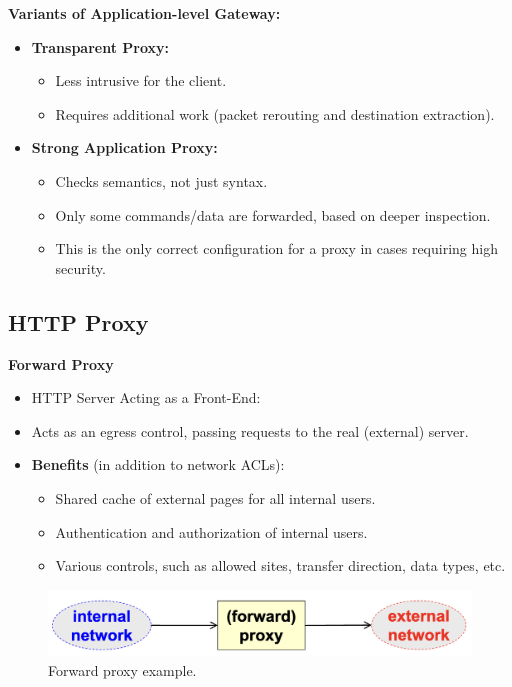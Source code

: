 \textbf{Variants of Application-level Gateway:}
\begin{itemize}
    \item \textbf{Transparent Proxy:}
    \begin{itemize}
        \item Less intrusive for the client.
        \item Requires additional work (packet rerouting and destination extraction).
    \end{itemize}
    \item \textbf{Strong Application Proxy:}
    \begin{itemize}
        \item Checks semantics, not just syntax.
        \item Only some commands/data are forwarded, based on deeper inspection.
        \item This is the only correct configuration for a proxy in cases requiring high security.
    \end{itemize}
\end{itemize}

\subsection*{HTTP Proxy}
\begin{center}
    \textbf{Forward Proxy}
\end{center}

\begin{itemize}
\item {HTTP Server Acting as a Front-End:}
\item Acts as an egress control, passing requests to the real (external) server.
\item \textbf{Benefits} (in addition to network ACLs):
\begin{itemize}
    \item Shared cache of external pages for all internal users.
    \item Authentication and authorization of internal users.
    \item Various controls, such as allowed sites, transfer direction, data types, etc.
\end{itemize}
\end{itemize}

\begin{figure}[H]
    \centering
    \includegraphics[width=0.5\linewidth]{Images/Firewalling/forward_proxy.png}
    \caption{Forward proxy example.}
\end{figure}
    
